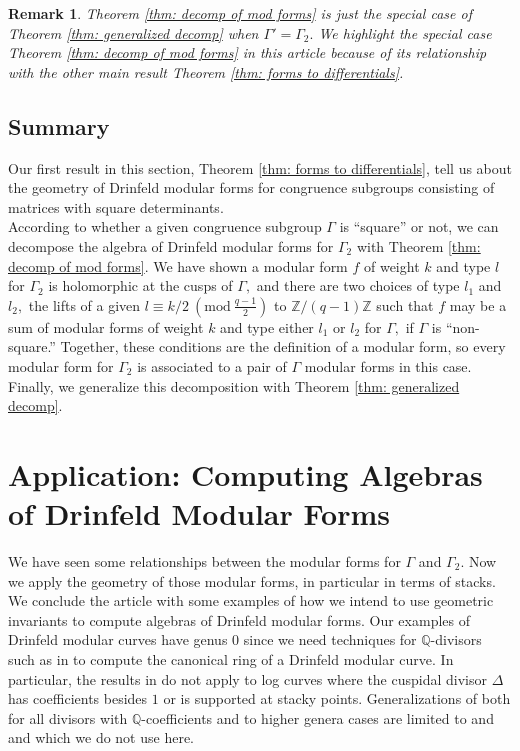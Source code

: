 \documentclass[11pt]{amsart}
\newtheorem{remark}[theorem]{Remark}
\theoremstyle{definition}
\numberwithin{equation}{section}
\newcommand{\bbQ}{\mathbb{Q}}		%
\newcommand{\bbZ}{\mathbb{Z}}		%
\newcommand{\Mod}[1]{\ (\mathrm{mod}\ #1)}
\begin{document}
\begin{remark}
	Theorem \ref{thm: decomp of mod forms} is just the special case of Theorem \ref{thm: generalized decomp} when $\Gamma'=\Gamma_2.$ We highlight the special case Theorem \ref{thm: decomp of mod forms} in this article because of its relationship with the other main result Theorem \ref{thm: forms to differentials}.
\end{remark}

\subsection{Summary}
Our first result in this section, Theorem \ref{thm: forms to differentials}, tell us about the geometry of Drinfeld modular forms for congruence subgroups consisting of matrices with square determinants.\\ 

According to whether a given congruence subgroup $\Gamma$ is ``square'' or not, we can decompose the algebra of Drinfeld modular forms for $\Gamma_2$ with Theorem \ref{thm: decomp of mod forms}.
We have shown a modular form $f$ of weight $k$ and type $l$ for $\Gamma_2$ is holomorphic at the cusps of $\Gamma,$ and there are two choices of type $l_1$ and $l_2,$ the lifts of a given $\displaystyle{l\equiv k/2\Mod{\frac{q-1}{2}}}$ to $\bbZ/(q-1)\bbZ$ such that $f$ may be a sum of modular forms of weight $k$ and type either $l_1$ or $l_2$ for $\Gamma,$ if $\Gamma$ is ``non-square.'' Together, these conditions are the definition of a modular form, so every modular form for $\Gamma_2$ is associated to a pair of $\Gamma$ modular forms in this case. Finally, we generalize this decomposition with Theorem \ref{thm: generalized decomp}.

\section{Application: Computing Algebras of Drinfeld Modular Forms}

We have seen some relationships between the modular forms for $\Gamma$ and $\Gamma_2.$ Now we apply the geometry of those modular forms, in particular in terms of stacks. We conclude the article with some examples of how we intend to use geometric invariants to compute algebras of Drinfeld modular forms. Our examples of Drinfeld modular curves have genus $0$ since we need techniques for $\bbQ$-divisors such as in \cite{ODorney-canonical-rings-Q-divisors-on-P1} to compute the canonical ring of a Drinfeld modular curve. In particular, the results in \cite{VZB} do not apply to log curves where the cuspidal divisor $\Delta$ has coefficients besides $1$ or is supported at stacky points. Generalizations of both \cite{VZB} for all divisors with $\bbQ$-coefficients and \cite{ODorney-canonical-rings-Q-divisors-on-P1} to higher genera cases are limited to \cite{LRZ} and \cite{Cerchia-Franklin-ODorney-Qdiv-Ell-curves} and which we do not use here.\\
\end{document}

